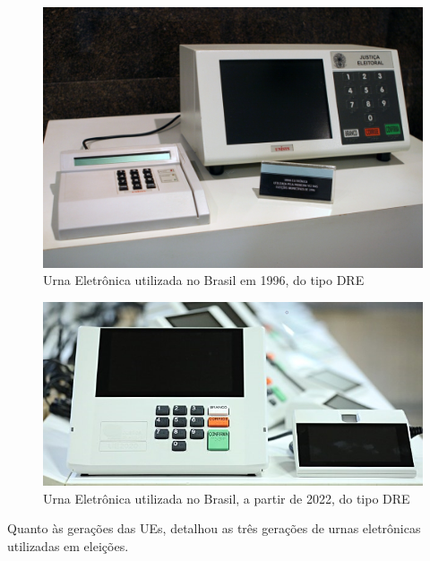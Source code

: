 \documentclass[portuguese]{textolivre}
\begin{document}
	\begin{figure}[htbp]
		\centering
		\begin{minipage}{.8\textwidth}
			\includegraphics[width=\textwidth]{fig-001.png} %
			\caption{Urna Eletrônica utilizada no Brasil em 1996, do tipo DRE}
			\label{fig_urna}
		\end{minipage}
	\end{figure}
	
	\begin{figure}[htbp]
		\centering
		\begin{minipage}{.8\textwidth}
			\includegraphics[width=\textwidth]{fig-002.png} %
			\caption{Urna Eletrônica utilizada no Brasil, a partir de 2022, do tipo DRE}
			\label{fig_urna_nova}
		\end{minipage}
	\end{figure}
	
	
	Quanto às gerações das UEs, \textcite{brunazo2016modelos} detalhou as três gerações de urnas eletrônicas utilizadas em eleições. 
	
\end{document}
